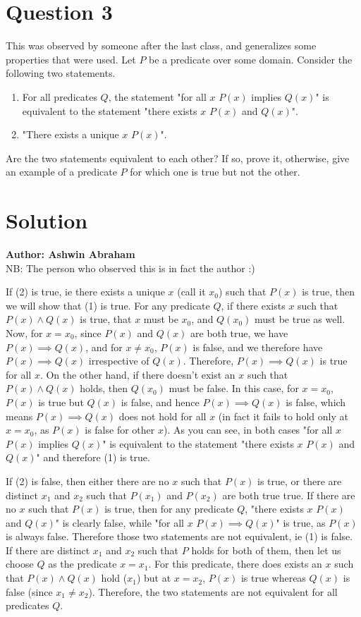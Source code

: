 \documentclass[12pt]{report}
\begin{document}
\section*{Question 3}
This was observed by someone after the last class, and generalizes some properties that were used. Let $P$ be a predicate over some domain. Consider the following two statements.
\begin{enumerate}
  \item For all predicates $Q$, the statement "for all $x$ $P(x)$ implies $Q(x)$" is equivalent to the statement "there exists $x$ $P(x)$ and $Q(x)$".
  \item "There exists a unique $x$ $P(x)$".
\end{enumerate}
Are the two statements equivalent to each other? If so, prove it, otherwise, give an example of a predicate $P$ for which one is true but not the other.
\section*{Solution}
\textbf{Author: Ashwin Abraham}\\
NB: The person who observed this is in fact the author :)

If (2) is true, ie there exists a unique $x$ (call it $x_{0}$) such that $P(x)$ is true, then we will show that (1) is true. For any predicate $Q$, if there exists $x$ such that $P(x) \land Q(x)$ is true, that $x$ must be $x_{0}$, and $Q(x_{0})$ must be true as well. Now, for $x = x_{0}$, since $P(x)$ and $Q(x)$ are both true, we have $P(x) \implies Q(x)$, and for $x \neq x_{0}$, $P(x)$ is false, and we therefore have $P(x) \implies Q(x)$ irrespective of $Q(x)$. Therefore, $P(x) \implies Q(x)$ is true for all $x$. On the other hand, if there doesn't exist an $x$ such that $P(x) \land Q(x)$ holds, then $Q(x_{0})$ must be false. In this case, for $x = x_{0}$, $P(x)$ is true but $Q(x)$ is false, and hence $P(x) \implies Q(x)$ is false, which means $P(x) \implies Q(x)$ does not hold for all $x$ (in fact it fails to hold only at $x = x_{0}$, as $P(x)$ is false for other $x$). As you can see, in both cases "for all $x$ $P(x)$ implies $Q(x)$" is equivalent to the statement "there exists $x$ $P(x)$ and $Q(x)$" and therefore (1) is true. 

If (2) is false, then either there are no $x$ such that $P(x)$ is true, or there are distinct $x_{1}$ and $x_{2}$ such that $P(x_{1})$ and $P(x_{2})$ are both true true. If there are no $x$ such that $P(x)$ is true, then for any predicate $Q$, "there exists $x$ $P(x)$ and $Q(x)$" is clearly false, while "for all $x$ $P(x) \implies Q(x)$" is true, as $P(x)$ is always false. Therefore those two statements are not equivalent, ie (1) is false. If there are distinct $x_{1}$ and $x_{2}$ such that $P$ holds for both of them, then let us choose $Q$ as the predicate $x = x_{1}$. For this predicate, there does exists an $x$ such that $P(x) \land Q(x)$ hold ($x_{1}$) but at $x = x_{2}$, $P(x)$ is true whereas $Q(x)$ is false (since $x_{1} \neq x_{2}$). Therefore, the two statements are not equivalent for all predicates $Q$.
\end{document}
